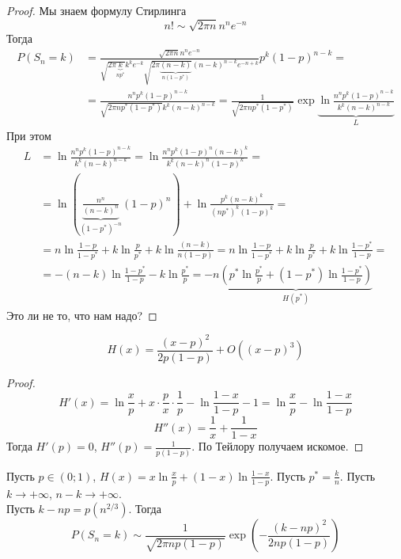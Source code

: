 \documentclass{article}
\begin{document}
    \begin{proof}
        Мы знаем формулу Стирлинга
        $$
        n!\sim\sqrt{2\pi n}n^ne^{-n}
        $$
        Тогда
        \[\begin{split}
            P(S_n=k)&=\frac{\sqrt{2\pi n}n^ne^{-n}}{\sqrt{2\pi\underbrace{k}_{np^*}}k^ke^{-k}\sqrt{2\pi\underbrace{(n-k)}_{n(1-p^*)}}(n-k)^{n-k}e^{-n+k}}p^k(1-p)^{n-k}=\\
            &=\frac{n^np^k(1-p)^{n-k}}{\sqrt{2\pi np^*(1-p^*)}k^k(n-k)^{n-k}}=\frac1{\sqrt{2\pi np^*(1-p^*)}}\exp\underbrace{\ln\frac{n^np^k(1-p)^{n-k}}{k^k(n-k)^{n-k}}}_L
        \end{split}\]
        При этом
        \[\begin{split}
            L&=\ln\frac{n^np^k(1-p)^{n-k}}{k^k(n-k)^{n-k}}=\ln\frac{n^np^k(1-p)^n(n-k)^k}{k^k(n-k)^n(1-p)^k}=\\
            &=\ln\left(\underbrace{\frac{n^n}{(n-k)^n}}_{(1-p^*)^{-n}}(1-p)^n\right)+\ln\frac{p^k(n-k)^k}{(np^*)^k(1-p)^k}=\\
            &=n\ln\frac{1-p}{1-p^*}+k\ln\frac{p}{p^*}+k\ln\frac{(n-k)}{n(1-p)}=n\ln\frac{1-p}{1-p^*}+k\ln\frac{p}{p^*}+k\ln\frac{1-p^*}{1-p}=\\
            &=-(n-k)\ln\frac{1-p^*}{1-p}-k\ln\frac{p^*}{p}=-n\underbrace{\left(p^*\ln\frac{p^*}{p}+(1-p^*)\ln\frac{1-p^*}{1-p}\right)}_{H(p^*)}
        \end{split}\]
        Это ли не то, что нам надо?
    \end{proof}
    \begin{lemma}
        $$
        H(x)=\frac{(x-p)^2}{2p(1-p)}+O((x-p)^3)
        $$
    \end{lemma}
    \begin{proof}
        $$
        H'(x)=\ln\frac xp+x\cdot\frac px\cdot\frac1p-\ln\frac{1-x}{1-p}-1=\ln\frac xp-\ln\frac{1-x}{1-p}
        $$
        $$
        H''(x)=\frac1x+\frac1{1-x}
        $$
        Тогда $H'(p)=0$, $H''(p)=\frac1{p(1-p)}$. По Тейлору получаем искомое.
    \end{proof}
    \begin{theorem}
        Пусть $p\in(0;1)$, $H(x)=x\ln\frac xp+(1-x)\ln\frac{1-x}{1-p}$. Пусть $p^*=\frac kn$. Пусть $k\rightarrow+\infty$, $n-k\rightarrow+\infty$.\\
        Пусть $k-np=p(n^{2/3})$. Тогда
        $$
        P(S_n=k)\sim\frac1{\sqrt{2\pi np(1-p)}}\exp\left(-\frac{(k-np)^2}{2np(1-p)}\right)
        $$
    \end{theorem}
\end{document}
